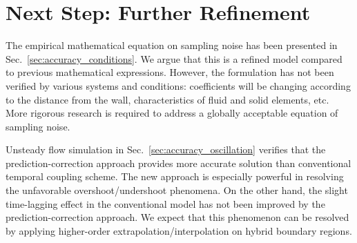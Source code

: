 \documentclass[preprint,12pt]{elsarticle}
\newcommand{\skonote}[1]{ {\textcolor{green} { ***Jeff: #1 }}}
\newcommand{\skonote}[1]{}
\begin{document}
\section{Next Step: Further Refinement}
\label{sec:futureworks}

The empirical mathematical equation on sampling noise has been presented in Sec.~\ref{sec:accuracy_conditions}. We argue that this is a refined model compared to previous mathematical expressions. However, the formulation has not been verified by various systems and conditions: coefficients will be changing according to the distance from the wall, characteristics of fluid and solid elements, etc. More rigorous research is required to address a globally acceptable equation of sampling noise.

Unsteady flow simulation in Sec.~\ref{sec:accuracy_oscillation} verifies that the prediction-correction approach provides more accurate solution than conventional temporal coupling scheme. The new approach is especially powerful in resolving the unfavorable overshoot/undershoot phenomena. On the other hand, the slight time-lagging effect in the conventional model has not been improved by the prediction-correction approach. We expect that this phenomenon can be resolved by applying higher-order extrapolation/interpolation on hybrid boundary regions.

\end{document}

